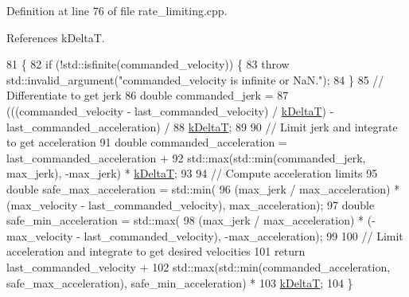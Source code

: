 Definition at line 76 of file rate\+\_\+limiting.\+cpp.



References k\+DeltaT.


\begin{DoxyCode}
81                                                      \{
82   \textcolor{keywordflow}{if} (!std::isfinite(commanded\_velocity)) \{
83     \textcolor{keywordflow}{throw} std::invalid\_argument(\textcolor{stringliteral}{"commanded\_velocity is infinite or NaN."});
84   \}
85   \textcolor{comment}{// Differentiate to get jerk}
86   \textcolor{keywordtype}{double} commanded\_jerk =
87       (((commanded\_velocity - last\_commanded\_velocity) / \hyperlink{namespacefranka_a1e207a0d5a6e90c1e1a78e6e1057120a}{kDeltaT}) - last\_commanded\_acceleration) /
88       \hyperlink{namespacefranka_a1e207a0d5a6e90c1e1a78e6e1057120a}{kDeltaT};
89 
90   \textcolor{comment}{// Limit jerk and integrate to get acceleration}
91   \textcolor{keywordtype}{double} commanded\_acceleration = last\_commanded\_acceleration +
92                                   std::max(std::min(commanded\_jerk, max\_jerk), -max\_jerk) * 
      \hyperlink{namespacefranka_a1e207a0d5a6e90c1e1a78e6e1057120a}{kDeltaT};
93 
94   \textcolor{comment}{// Compute acceleration limits}
95   \textcolor{keywordtype}{double} safe\_max\_acceleration = std::min(
96       (max\_jerk / max\_acceleration) * (max\_velocity - last\_commanded\_velocity), max\_acceleration);
97   \textcolor{keywordtype}{double} safe\_min\_acceleration = std::max(
98       (max\_jerk / max\_acceleration) * (-max\_velocity - last\_commanded\_velocity), -max\_acceleration);
99 
100   \textcolor{comment}{// Limit acceleration and integrate to get desired velocities}
101   \textcolor{keywordflow}{return} last\_commanded\_velocity +
102          std::max(std::min(commanded\_acceleration, safe\_max\_acceleration), safe\_min\_acceleration) *
103              \hyperlink{namespacefranka_a1e207a0d5a6e90c1e1a78e6e1057120a}{kDeltaT};
104 \}
\end{DoxyCode}
\mbox{\label{namespacefranka_a795142512ca54c220b2f2d52e239e35d}} 
